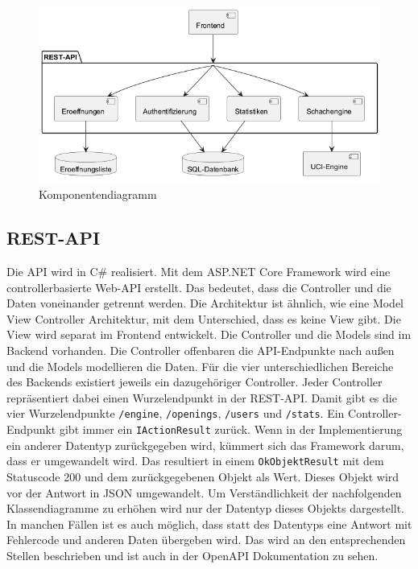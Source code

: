 \begin{figure}[h]
    \includegraphics[width=\linewidth]{images/diagrams/components.png}
    \caption{Komponentendiagramm}
    \label{fig:components}
\end{figure}

\subsection{REST-API}
Die API wird in C\# realisiert. Mit dem ASP.NET Core Framework wird eine controllerbasierte Web-API erstellt. Das bedeutet, dass die Controller und die Daten voneinander getrennt werden. Die Architektur ist ähnlich, wie eine Model View Controller Architektur, mit dem Unterschied, dass es keine View gibt. Die View wird separat im Frontend entwickelt. Die Controller und die Models sind im Backend vorhanden. Die Controller offenbaren die API-Endpunkte nach außen und die Models modellieren die Daten. Für die vier unterschiedlichen Bereiche des Backends existiert jeweils ein dazugehöriger Controller. Jeder Controller repräsentiert dabei einen Wurzelendpunkt in der REST-API. Damit gibt es die vier Wurzelendpunkte \lstinline{/engine}, \lstinline{/openings}, \lstinline{/users} und \lstinline{/stats}. Ein Controller-Endpunkt gibt immer ein \lstinline{IActionResult} zurück. Wenn in der Implementierung ein anderer Datentyp zurückgegeben wird, kümmert sich das Framework darum, dass er umgewandelt wird. Das resultiert in einem \lstinline{OkObjektResult} mit dem Statuscode 200 und dem zurückgegebenen Objekt als Wert. Dieses Objekt wird vor der Antwort in JSON umgewandelt. Um Verständlichkeit der nachfolgenden Klassendiagramme zu erhöhen wird nur der Datentyp dieses Objekts dargestellt. In manchen Fällen ist es auch möglich, dass statt des Datentyps eine Antwort mit Fehlercode und anderen Daten übergeben wird. Das wird an den entsprechenden Stellen beschrieben und ist auch in der OpenAPI Dokumentation zu sehen.


